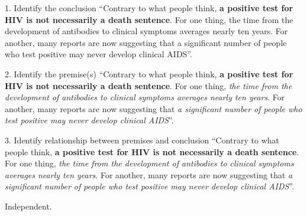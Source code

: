 \documentclass{beamer}
\begin{document}

\begin{frame}{1. Identify the conclusion}
``Contrary to what people think, \textbf{a positive test for HIV is not necessarily a death sentence}. For one thing, the time from the development of antibodies to clinical symptoms averages nearly ten years. For another, many reports are now suggesting that a significant number of people who test positive may never develop clinical AIDS''.
\end{frame}


\begin{frame}{2. Identify the premise(s)}
``Contrary to what people think, \textbf{a positive test for HIV is not necessarily a death sentence}. For one thing, \emph{the time from the development of antibodies to clinical symptoms averages nearly ten years}. For another, many reports are now suggesting that \emph{a significant number of people who test positive may never develop clinical AIDS}''.
\end{frame}




\begin{frame}{3. Identify relationship between premises and conclusion}
	``Contrary to what people think, \textbf{a positive test for HIV is not necessarily a death sentence}. For one thing, \emph{the time from the development of antibodies to clinical symptoms averages nearly ten years}. For another, many reports are now suggesting that \emph{a significant number of people who test positive may never develop clinical AIDS}''.
	
\vspace{12pt}
Independent.
\end{frame}
\end{document}
